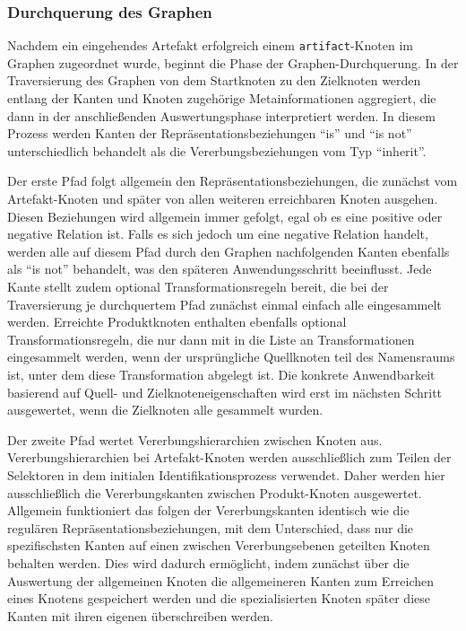\subsubsection{Durchquerung des Graphen}\label{subsubsec:model-traversal}

Nachdem ein eingehendes Artefakt erfolgreich einem \texttt{artifact}-Knoten im Graphen zugeordnet wurde, beginnt die Phase der Graphen-Durchquerung.
In der Traversierung des Graphen von dem Startknoten zu den Zielknoten werden entlang der Kanten und Knoten zugehörige Metainformationen aggregiert, die dann in der anschließenden Auswertungsphase interpretiert werden.
In diesem Prozess werden Kanten der Repräsentationsbeziehungen \enquote{is} und \enquote{is not} unterschiedlich behandelt als die Vererbungsbeziehungen vom Typ \enquote{inherit}.

Der erste Pfad folgt allgemein den Repräsentationsbeziehungen, die zunächst vom Artefakt-Knoten und später von allen weiteren erreichbaren Knoten ausgehen.
Diesen Beziehungen wird allgemein immer gefolgt, egal ob es eine positive oder negative Relation ist.
Falls es sich jedoch um eine negative Relation handelt, werden alle auf diesem Pfad durch den Graphen nachfolgenden Kanten ebenfalls als \enquote{is not} behandelt, was den späteren Anwendungsschritt beeinflusst.
Jede Kante stellt zudem optional Transformationsregeln bereit, die bei der Traversierung je durchquertem Pfad zunächst einmal einfach alle eingesammelt werden.
Erreichte Produktknoten enthalten ebenfalls optional Transformationsregeln, die nur dann mit in die Liste an Transformationen eingesammelt werden, wenn der ursprüngliche Quellknoten teil des Namensraums ist, unter dem diese Transformation abgelegt ist.
Die konkrete Anwendbarkeit basierend auf Quell- und Zielknoteneigenschaften wird erst im nächsten Schritt ausgewertet, wenn die Zielknoten alle gesammelt wurden.

Der zweite Pfad wertet Vererbungshierarchien zwischen Knoten aus.
Vererbungshierarchien bei Artefakt-Knoten werden ausschließlich zum Teilen der Selektoren in dem initialen Identifikationsprozess verwendet.
Daher werden hier ausschließlich die Vererbungskanten zwischen Produkt-Knoten ausgewertet.
Allgemein funktioniert das folgen der Vererbungskanten identisch wie die regulären Repräsentationsbeziehungen, mit dem Unterschied, dass nur die spezifischsten Kanten auf einen zwischen Vererbungsebenen geteilten Knoten behalten werden.
Dies wird dadurch ermöglicht, indem zunächst über die Auswertung der allgemeinen Knoten die allgemeineren Kanten zum Erreichen eines Knotens gespeichert werden und die spezialisierten Knoten später diese Kanten mit ihren eigenen überschreiben werden.

